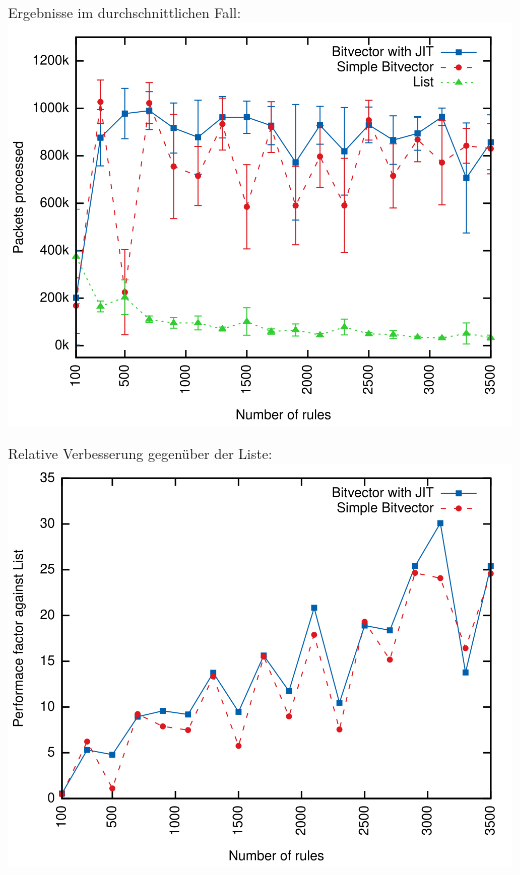 \documentclass[xcolor=x11names,compress]{beamer}
\renewcommand{\(}{\begin{columns}}
\renewcommand{\)}{\end{columns}}
\newcommand{\<}[1]{\begin{column}{#1}}
\renewcommand{\>}{\end{column}}
\begin{document}
\begin{frame}[noframenumbering]
  Ergebnisse im durchschnittlichen Fall:
  \includegraphics[height=0.9\textheight]{figures/eval_a}
\end{frame}

\begin{frame}[noframenumbering]
  Relative Verbesserung gegenüber der Liste:
  \includegraphics[height=0.9\textheight]{figures/eval_a_relative}
\end{frame}
\end{document}
